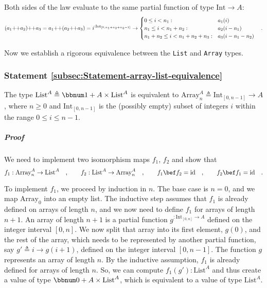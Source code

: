 Both sides of the law evaluate to the same partial function of type
$\text{Int}\rightarrow A$:
\[
(a_{1}\negmedspace+\negthickspace+a_{2})\negmedspace+\negthickspace+a_{3}=a_{1}\negmedspace+\negthickspace+(a_{2}\negmedspace+\negthickspace+a_{3})=i^{:\text{Int}_{[0,n_{1}+n_{2}+n_{3}-1]}}\rightarrow\begin{cases}
0\leq i<n_{1}: & a_{1}(i)\\
n_{1}\leq i<n_{1}+n_{2}: & a_{2}(i-n_{1})\\
n_{1}+n_{2}\leq i<n_{1}+n_{2}+n_{3}: & a_{3}(i-n_{1}-n_{2})
\end{cases}\quad.
\]

Now we establish a rigorous equivalence between the \lstinline!List!
and \lstinline!Array! types.

\subsubsection{Statement \label{subsec:Statement-array-list-equivalence}\ref{subsec:Statement-array-list-equivalence}}

The type $\text{List}^{A}\triangleq\bbnum 1+A\times\text{List}^{A}$
is equivalent to $\text{Array}_{n}^{A}\triangleq\text{Int}_{[0,n-1]}\rightarrow A$,
where $n\geq0$ and $\text{Int}_{[0,n-1]}$ is the (possibly empty)
subset of integers $i$ within the range $0\leq i\leq n-1$.

\subparagraph{Proof}

We need to implement two isomorphism maps $f_{1}$, $f_{2}$ and show
that 
\[
f_{1}:\text{Array}_{n}^{A}\rightarrow\text{List}^{A}\quad,\quad\quad f_{2}:\text{List}^{A}\rightarrow\text{Array}_{n}^{A}\quad,\quad\quad f_{1}\bef f_{2}=\text{id}\quad,\quad\quad f_{2}\bef f_{1}=\text{id}\quad.
\]

To implement $f_{1}$, we proceed by induction in $n$. The base case
is $n=0$, and we map $\text{Array}_{0}$ into an empty list. The
inductive step assumes that $f_{1}$ is already defined on arrays
of length $n$, and we now need to define $f_{1}$ for arrays of length
$n+1$. An array of length $n+1$ is a partial function $g^{:\text{Int}_{[0,n]}\rightarrow A}$
defined on the integer interval $[0,n]$. We now split that array
into its first element, $g(0)$, and the rest of the array, which
needs to be represented by another partial function, say $g'\triangleq i\rightarrow g(i+1)$,
defined on the integer interval $[0,n-1]$. The function $g$ represents
an array of length $n$. By the inductive assumption, $f_{1}$ is
already defined for arrays of length $n$. So, we can compute $f_{1}(g'):\text{List}^{A}$
and thus create a value of type $\bbnum 0+A\times\text{List}^{A}$,
which is equivalent to a value of type $\text{List}^{A}$.

